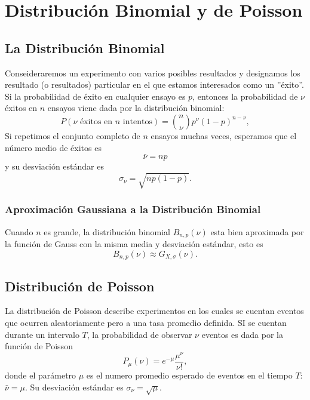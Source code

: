\chapter{Distribución Binomial y de Poisson}
\section{La Distribución Binomial}
Conseideraremos un experimento con varios posibles resultados y designamos los resultado (o resultados) particular en el que estamos interesados como un ''éxito''. Si la probabilidad de éxito en cualquier ensayo es $p$, entonces la probabilidad de $\nu$ éxitos en $n$ ensayos viene dada por la distribución binomial:
	\begin{equation}
		P(\nu \text{ éxitos en } n \text{ intentos}) = \binom{n}{\nu} p^\nu (1 - p)^{n - \nu},
	\end{equation}
Si repetimos el conjunto completo de $n$ ensayos muchas veces, esperamos que el número medio de éxitos es
	\begin{equation}
		\bar{\nu} = np
	\end{equation}
y su desviación estándar es
	\begin{equation}
		\sigma _\nu = \sqrt{np(1 - p)}.
	\end{equation}

\subsection{Aproximación Gaussiana a la Distribución Binomial}
Cuando $n$ es grande, la distribución binomial $B_{n,p} (\nu)$ esta bien aproximada por la función de Gauss con la misma media y desviación estándar, esto es
	\begin{equation}
		B_{n,p} (\nu) \approx G_{X,\sigma} (\nu).
	\end{equation}


\section{Distribución de Poisson}
La distribución de Poisson describe experimentos en los cuales se cuentan eventos que ocurren aleatoriamente pero a una tasa promedio definida. SI se cuentan durante un intervalo $T$, la probabilidad de observar $\nu$ eventos es dada por la función de Poisson
	\begin{equation}
		P_\mu (\nu) = e^{-\mu} \frac{\mu ^\nu}{\nu !},
	\end{equation}
donde el parámetro $\mu$ es el numero promedio esperado de eventos en el tiempo $T$: $\bar{\nu} = \mu$. Su desviación estándar es $\sigma _\nu = \sqrt{\mu}$.

